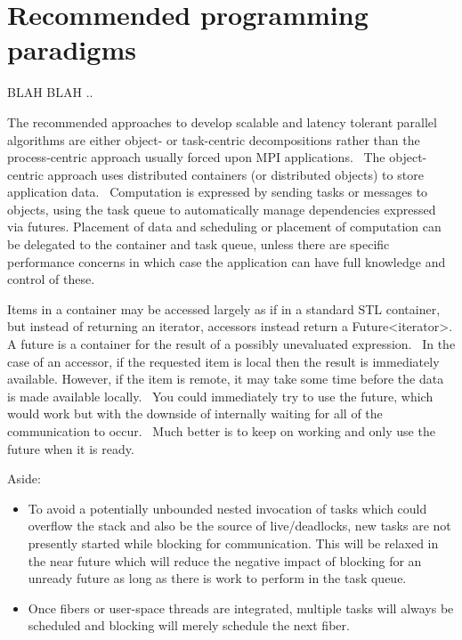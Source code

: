 \documentclass[letterpaper]{article}
\newcommand\liststyleLvii{%
\renewcommand\labelitemi{{}--}
\renewcommand\labelitemii{{}--}
\renewcommand\labelitemiii{{}--}
\renewcommand\labelitemiv{{}--}
}
\begin{document}
\section{Recommended programming paradigms}
BLAH BLAH ..

The recommended approaches to develop scalable and latency tolerant parallel algorithms are either object- or
task-centric decompositions rather than the process-centric approach usually forced upon MPI applications. \ The
object-centric approach uses distributed containers (or distributed objects) to store application data. \ Computation
is expressed by sending tasks or messages to objects, using the task queue to automatically manage dependencies
expressed via futures. Placement of data and scheduling or placement of computation can be delegated to the container
and task queue, unless there are specific performance concerns in which case the application can have full knowledge
and control of these.

Items in a container may be accessed largely as if in a standard STL container, but instead of returning an iterator,
accessors instead return a Future{\textless}iterator{\textgreater}. A future is a container for the result of a
possibly unevaluated expression. \ In the case of an accessor, if the requested item is local then the result is
immediately available. However, if the item is remote, it may take some time before the data is made available locally.
\ You could immediately try to use the future, which would work but with the downside of internally waiting for all of
the communication to occur. \ Much better is to keep on working and only use the future when it is ready.

Aside:

\liststyleLvii
\begin{itemize}
\item To avoid a potentially unbounded nested invocation of tasks which could overflow the stack and also be the source
of live/deadlocks, new tasks are not presently started while blocking for communication. This will be relaxed in the
near future which will reduce the negative impact of blocking for an unready future as long as there is work to perform
in the task queue.
\item Once fibers or user-space threads are integrated, multiple tasks will always be scheduled and blocking will merely
schedule the next fiber.
\end{itemize}

\bigskip
\end{document}
